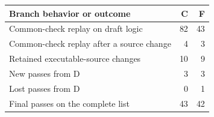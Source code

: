 \begin{tabular}{lrr}
\toprule
Branch behavior or outcome & C & F \\
\midrule
Common-check replay on draft logic & 82 & 43 \\
Common-check replay after a source change & 4 & 3 \\
Retained executable-source changes & 10 & 9 \\
New passes from D & 3 & 3 \\
Lost passes from D & 0 & 1 \\
Final passes on the complete list & 43 & 42 \\
\bottomrule
\end{tabular}
